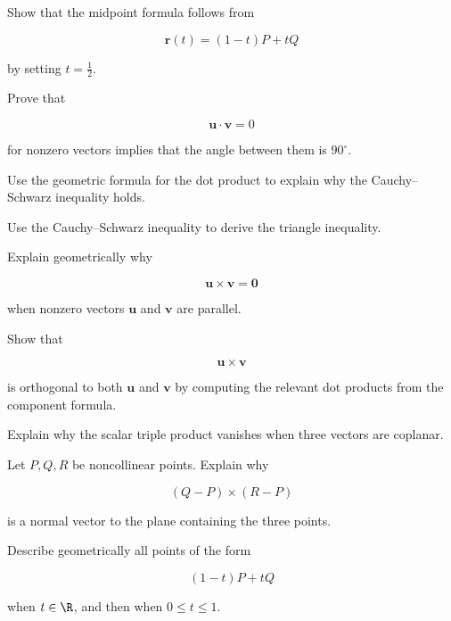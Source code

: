 \begin{exercise}[3]
Show that the midpoint formula follows from

\[ \mathbf{r}(t)=(1-t)P+tQ \]

by setting \(t=\frac12\).
\end{exercise}

\begin{exercise}[3]
Prove that

\[ \mathbf{u}\cdot\mathbf{v}=0 \]

for nonzero vectors implies that the angle between them is \(90^\circ\).
\end{exercise}

\begin{exercise}[3]
Use the geometric formula for the dot product to explain why the
Cauchy--Schwarz inequality holds.
\end{exercise}

\begin{exercise}[3]
Use the Cauchy--Schwarz inequality to derive the triangle inequality.
\end{exercise}

\begin{exercise}[3]
Explain geometrically why

\[ \mathbf{u}\times\mathbf{v}=\mathbf{0} \]

when nonzero vectors \(\mathbf{u}\) and \(\mathbf{v}\) are parallel.
\end{exercise}

\begin{exercise}[3]
Show that

\[ \mathbf{u}\times\mathbf{v} \]

is orthogonal to both \(\mathbf{u}\) and \(\mathbf{v}\) by computing the
relevant dot products from the component formula.
\end{exercise}

\begin{exercise}[3]
Explain why the scalar triple product vanishes when three vectors are
coplanar.
\end{exercise}

\begin{exercise}[3]
Let \(P,Q,R\) be noncollinear points. Explain why

\[ (Q-P)\times(R-P) \]

is a normal vector to the plane containing the three points.
\end{exercise}

\begin{exercise}[3]
Describe geometrically all points of the form

\[ (1-t)P+tQ \]

when \(t\in\R\), and then when \(0\leq t\leq1\).
\end{exercise}

